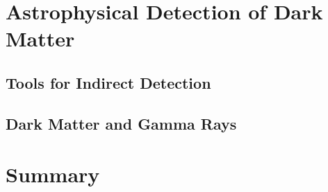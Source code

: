 \section{Astrophysical Detection of Dark Matter}
\label{sec:astrodm}

\subsection{Tools for Indirect Detection}

\subsection{Dark Matter and Gamma Rays}

\section{Summary}
\label{sec:summary}



